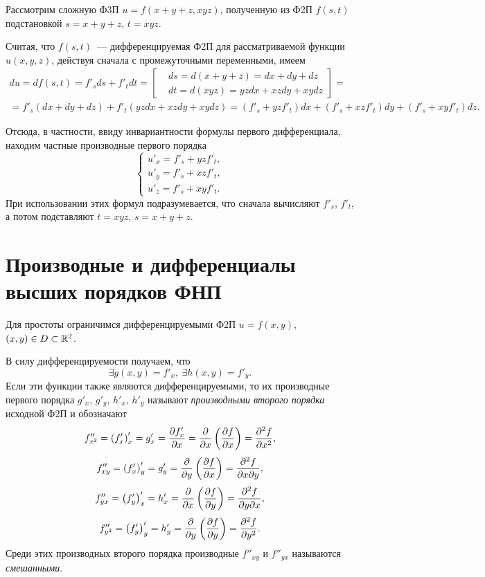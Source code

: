 \documentclass[../../main.tex]{subfiles}
\begin{document}
	\begin{exmp}
		Рассмотрим сложную Ф3П $u=f(x+y+z,xyz)$, полученную из Ф2П $f(s,t)$ 
		подстановкой $s=x+y+z$, $t=xyz$.
		
		Считая, что $f(s,t)$~--- дифференцируемая Ф2П для рассматриваемой 
		функции $u(x,y,z)$, действуя сначала с промежуточными переменными, имеем
		\begin{gather*}
			du = df(s,t) = f'_sds + f'_tdt = \left[\begin{aligned}
				& ds = d(x + y + z) = dx + dy + dz\\
				& dt = d(xyz) = yzdx + xzdy + xydz
			\end{aligned}\right] = \\
			= f'_s\left(dx + dy + dz\right) + 
			f'_t\left(yzdx + xzdy + xydz\right) = 
			\left(f'_s + yzf'_t\right)dx + 
			\left(f'_s + xzf'_t\right)dy + 
			\left(f'_s + xyf'_t\right)dz.
		\end{gather*}
		
		Отсюда, в частности, ввиду инвариантности формулы первого 
		дифференциала, находим частные производные первого порядка
		\[\begin{cases}
			u'_x = f'_s + yzf'_t,\\
			u'_y = f'_s + xzf'_t,\\
			u'_z = f'_s + xyf'_t.
		\end{cases}\]
		При использовании этих формул подразумевается, что сначала 
		вычисляют $f'_s$, $f'_t$, а потом подставляют 
		$t = xyz$, $s = x + y + z$.
	\end{exmp}

	\section{Производные и дифференциалы высших порядков ФНП}
	
	Для простоты ограничимся дифференцируемыми Ф2П $u=f(x,y)$, $(x,y)\in 
	D\subset \mathbb{R}^2$.
	
	В силу дифференцируемости получаем, что
	\[\exists g(x,y) = f'_x,\ \exists h(x,y) = f'_y.\]
	Если эти функции также являются дифференцируемыми, то их производные 
	первого порядка $g'_x$, $g'_y$, $h'_x$, $h'_y$ называют \emph{производными 
	второго порядка} исходной Ф2П и обозначают 
	\[f''_{x^2} = \left(f'_x\right)'_x = g'_x = \frac{\partial f'_x}{\partial x} =
	 \frac{\partial }{\partial x}\left(\frac{\partial f}{\partial x}\right) = \frac{\partial ^2f}{\partial x^2},\]
	\[f''_{xy} = \left(f'_x\right)'_y = g'_y = 
	\frac{\partial }{\partial y}\left(\frac{\partial f}{\partial x}\right) = \frac{\partial ^2f}{\partial x\partial y},\]
	\[f''_{yx} = \left(f'_y\right)'_x = h'_x = 
	\frac{\partial }{\partial x}\left(\frac{\partial f}{\partial y}\right) = \frac{\partial ^2f}{\partial y\partial x},\]
	\[f''_{y^2} = \left(f'_y\right)'_y = h'_y = 
	\frac{\partial }{\partial y}\left(\frac{\partial f}{\partial y}\right) = \frac{\partial ^2f}{\partial y^2}.\]
	Среди этих производных второго порядка производные $f''_{xy}$ и 
	$f''_{yx}$ называются \emph{смешанными}.
	
\end{document}
